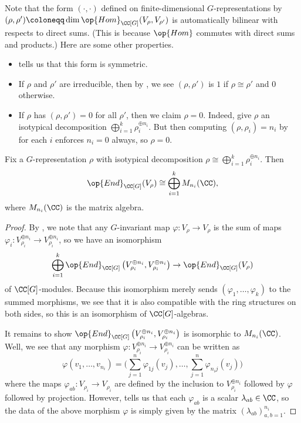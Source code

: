 \documentclass[../main.tex]{subfiles}
\begin{document}
\begin{remark}
	Note that the form $(\cdot,\cdot)$ defined on finite-dimensional $G$-representations by $(\rho,\rho')\coloneqq\dim\op{Hom}_{\CC[G]}(V_\rho,V_{\rho'})$ is automatically bilinear with respects to direct sums. (This is because $\op{Hom}$ commutes with direct sums and products.) Here are some other properties.
	\begin{itemize}
		\item {} tells us that this form is symmetric.
		\item If $\rho$ and $\rho'$ are irreducible, then by , we see $(\rho,\rho')$ is $1$ if $\rho\cong\rho'$ and $0$ otherwise.
		\item If $\rho$ has $(\rho,\rho')=0$ for all $\rho'$, then we claim $\rho=0$. Indeed, give $\rho$ an isotypical decomposition $\bigoplus_{i=1}^k\rho_i^{\oplus n_i}$. But then computing $(\rho,\rho_i)=n_i$ by  for each $i$ enforces $n_i=0$ always, so $\rho=0$.
	\end{itemize}
\end{remark}
\begin{corollary}
	Fix a $G$-representation $\rho$ with isotypical decomposition $\rho\cong\bigoplus_{i=1}^k\rho_i^{\oplus n_i}$. Then
	\[\op{End}_{\CC[G]}(V_\rho)\cong\bigoplus_{i=1}^kM_{n_i}(\CC),\]
	where $M_{n_i}(\CC)$ is the matrix algebra.
\end{corollary}
\begin{proof}
	By , we note that any $G$-invariant map $\varphi\colon V_\rho\to V_\rho$ is the sum of maps $\varphi_i\colon V_{\rho_i}^{\oplus n_i}\to V_{\rho_i}^{\oplus n_i}$, so we have an isomorphism
	\[\bigoplus_{i=1}^k\op{End}_{\CC[G]}\left(V_{\rho_i}^{\oplus n_i},V_{\rho_i}^{\oplus n_i}\right)\to\op{End}_{\CC[G]}(V_\rho)\]
	of $\CC[G]$-modules. Because this isomorphism merely sends $(\varphi_1,\ldots,\varphi_k)$ to the summed morphisms, we see that it is also compatible with the ring structures on both sides, so this is an isomorphism of $\CC[G]$-algebras.

	It remains to show $\op{End}_{\CC[G]}\left(V_{\rho_i}^{\oplus n_i},V_{\rho_i}^{\oplus n_i}\right)$ is isomorphic to $M_{n_i}(\CC)$. Well, we see that any morphism $\varphi\colon V_{\rho_i}^{\oplus n_i}\to V_{\rho_i}^{\oplus n_i}$ can be written as
	\[\varphi(v_1,\ldots,v_{n_i})=\Bigg(\sum_{j=1}^n\varphi_{1j}(v_j),\ldots,\sum_{j=1}^n\varphi_{n_ij}(v_j)\Bigg)\]
	where the maps $\varphi_{ab}\colon V_{\rho_i}\to V_{\rho_i}$ are defined by the inclusion to $V_{\rho_i}^{\oplus n_i}$ followed by $\varphi$ followed by projection. However,  tells us that each $\varphi_{ab}$ is a scalar $\lambda_{ab}\in\CC$, so the data of the above morphism $\varphi$ is simply given by the matrix $(\lambda_{ab})_{a,b=1}^{n_i}$.
\end{proof}
\end{document}
